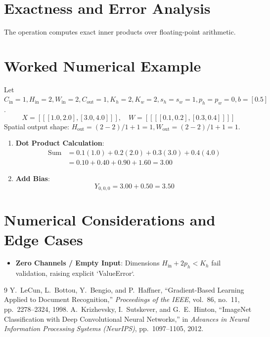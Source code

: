\documentclass[11pt,a4paper]{article}
\theoremstyle{definition}
\begin{document}
\section{Exactness and Error Analysis}

The operation computes exact inner products over floating-point arithmetic.

\section{Worked Numerical Example}

Let $C_{\text{in}} = 1, H_{\text{in}} = 2, W_{\text{in}} = 2, C_{\text{out}} = 1, K_h = 2, K_w = 2, s_h = s_w = 1, p_h = p_w = 0, b = [0.5]$.
\begin{equation}
X = [[[1.0, 2.0], [3.0, 4.0]]], \quad W = [[[[0.1, 0.2], [0.3, 0.4]]]]
\end{equation}
Spatial output shape: $H_{\text{out}} = (2 - 2)/1 + 1 = 1, W_{\text{out}} = (2 - 2)/1 + 1 = 1$.

\begin{enumerate}
    \item \textbf{Dot Product Calculation}:
    \begin{align}
    \text{Sum} &= 0.1(1.0) + 0.2(2.0) + 0.3(3.0) + 0.4(4.0) \\
    &= 0.10 + 0.40 + 0.90 + 1.60 = 3.00
    \end{align}
    \item \textbf{Add Bias}:
    \begin{equation}
    Y_{0, 0, 0} = 3.00 + 0.50 = 3.50
    \end{equation}
\end{enumerate}

\section{Numerical Considerations and Edge Cases}

\begin{itemize}
    \item \textbf{Zero Channels / Empty Input}: Dimensions $H_{\text{in}} + 2p_h < K_h$ fail validation, raising explicit `ValueError`.
\end{itemize}

\begin{thebibliography}{9}
 Y.~LeCun, L.~Bottou, Y.~Bengio, and P.~Haffner, ``Gradient-Based Learning Applied to Document Recognition,'' \emph{Proceedings of the IEEE}, vol.~86, no.~11, pp.~2278--2324, 1998.
 A.~Krizhevsky, I.~Sutskever, and G.~E.~Hinton, ``ImageNet Classification with Deep Convolutional Neural Networks,'' in \emph{Advances in Neural Information Processing Systems (NeurIPS)}, pp.~1097--1105, 2012.
\end{thebibliography}
\end{document}
